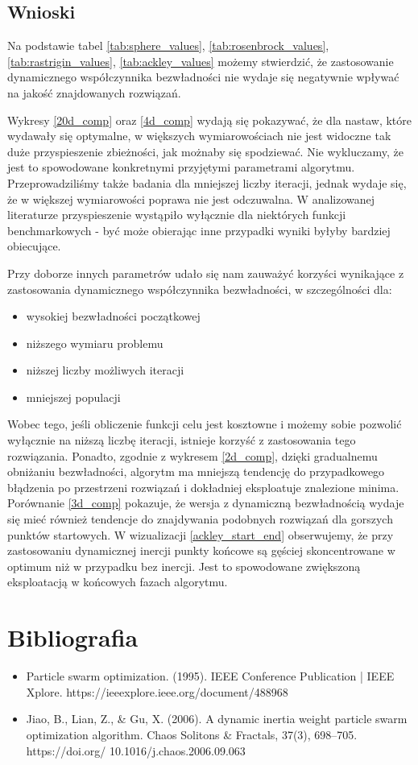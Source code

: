 \documentclass[12pt]{article}
\begin{document}
\subsection*{Wnioski}
Na podstawie tabel \ref{tab:sphere_values}, \ref{tab:rosenbrock_values}, \ref{tab:rastrigin_values}, \ref{tab:ackley_values} możemy stwierdzić, że
zastosowanie dynamicznego współczynnika bezwładności nie wydaje się negatywnie wpływać na jakość znajdowanych rozwiązań.

Wykresy \ref{20d_comp} oraz \ref{4d_comp} wydają się pokazywać, że dla nastaw, które wydawały się optymalne, w większych wymiarowościach nie jest widoczne tak duże
przyspieszenie zbieżności, jak możnaby się spodziewać. Nie wykluczamy, że jest to spowodowane konkretnymi przyjętymi parametrami algorytmu. Przeprowadziliśmy
także badania dla mniejszej liczby iteracji, jednak wydaje się, że w większej wymiarowości poprawa nie jest odczuwalna. W analizowanej literaturze przyspieszenie
wystąpiło wyłącznie dla niektórych funkcji benchmarkowych - być może obierając inne przypadki wyniki byłyby bardziej obiecujące.

Przy doborze innych parametrów udało się nam zauważyć korzyści wynikające z zastosowania dynamicznego współczynnika bezwładności, w szczególności dla:
\begin{itemize}
	\item wysokiej bezwładności początkowej
	\item niższego wymiaru problemu
	\item niższej liczby możliwych iteracji
	\item mniejszej populacji
\end{itemize}

Wobec tego, jeśli obliczenie funkcji celu jest kosztowne i możemy sobie pozwolić wyłącznie na niższą liczbę iteracji, istnieje korzyść z zastosowania tego rozwiązania.
Ponadto, zgodnie z wykresem \ref{2d_comp}, dzięki gradualnemu obniżaniu bezwładności, algorytm ma mniejszą tendencję do przypadkowego błądzenia po przestrzeni rozwiązań i
dokładniej eksploatuje znalezione minima. Porównanie \ref{3d_comp} pokazuje, że wersja z dynamiczną bezwładnością wydaje się mieć również tendencje do znajdywania podobnych
rozwiązań dla gorszych punktów startowych. W wizualizacji \ref{ackley_start_end} obserwujemy, że przy zastosowaniu dynamicznej inercji punkty końcowe są gęściej skoncentrowane
w optimum niż w przypadku bez inercji. Jest to spowodowane zwiększoną eksploatacją w końcowych fazach algorytmu.

\section{Bibliografia}
\begin{itemize}
	\item{Particle swarm optimization. (1995). IEEE Conference Publication | IEEE Xplore. https://ieeexplore.ieee.org/document/488968}
	\item{Jiao, B., Lian, Z., \& Gu, X. (2006). A dynamic inertia weight particle swarm optimization algorithm. Chaos Solitons \& Fractals, 37(3), 698–705. https://doi.org/ 10.1016/j.chaos.2006.09.063}
\end{itemize}
\end{document}
